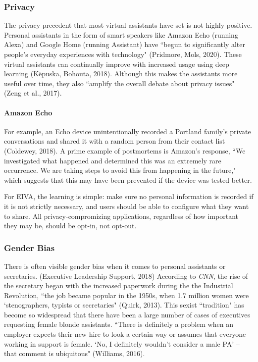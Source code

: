 \documentclass{article}
\begin{document}
\subsubsection{Privacy}

The privacy precedent that most virtual assistants have set is not highly positive. Personal assistants in the form of smart speakers like Amazon Echo (running Alexa) and Google Home (running Assistant) have ``begun to significantly alter people’s everyday experiences with technology" (Pridmore, Mols, 2020). These virtual assistants can continually improve with increased usage using deep learning (Këpuska, Bohouta, 2018). Although this makes the assistants more useful over time, they also ``amplify the overall debate about privacy issues" (Zeng et al., 2017).

\paragraph{Amazon Echo}

For example, an Echo device unintentionally recorded a Portland family's private conversations and shared it with a random person from their contact list (Coldewey, 2018). A prime example of postmortems is Amazon's response, ``We investigated what happened and determined this was an extremely rare occurrence. We are taking steps to avoid this from happening in the future," which suggests that this may have been prevented if the device was tested better.

For EIVA, the learning is simple: make sure no personal information is recorded if it is not strictly necessary, and users should be able to configure what they want to share. All privacy-compromizing applications, regardless of how important they may be, should be opt-in, not opt-out.

\subsubsection{Gender Bias}

There is often visible gender bias when it comes to personal assistants or secretaries. (Executive Leadership Support, 2018) According to \emph{CNN}, the rise of the secretary began with the increased paperwork during the the Industrial Revolution, ``the job became popular in the 1950s, when 1.7 million women were ‘stenographers, typists or secretaries" (Quirk, 2013). This sexist ``tradition" has become so widespread that there have been a large number of cases of executives requesting female blonde assistants. ``There is definitely a problem when an employer expects their new hire to look a certain way or assumes that everyone working in support is female. `No, I definitely wouldn’t consider a male PA' -- that comment is ubiquitous" (Williams, 2016).
\end{document}
